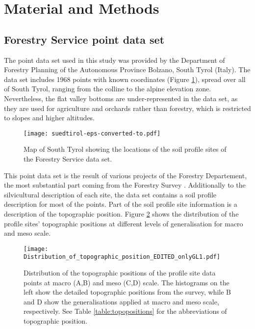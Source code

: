 \documentclass[preprint,12pt,authoryear]{elsarticle}
\begin{document}
\section{Material and Methods}
\subsection{Forestry Service point data set}
The point data set used in this study was provided by the Department of Forestry Planning of the Autonomous Province Bolzano, South Tyrol (Italy).
The data set includes 1968 points with known coordinates (Figure \ref{fig:datapoints}), spread over all of South Tyrol, ranging from the colline to the alpine elevation zone. Nevertheless, the flat valley bottoms are under-represented in the data set, as they are used for agriculture and orchards rather than forestry, which is restricted to slopes and higher altitudes.
\begin{figure}
\texttt{[image: suedtirol-eps-converted-to.pdf]}
\caption{Map of South Tyrol showing the locations of the soil profile sites of the Forestry Service data set.}
\label{fig:datapoints}
\end{figure}
 This point data set is the result of  various projects of the Forestry Departement, the most substantial part coming from the Forestry Survey \citep{APB2006}. Additionally to the silvicultural description of each site, the data set contains a soil profile description for most of the points. Part of the soil profile site information is a description of the topographic position. Figure \ref{fig:hist} shows the distribution of the profile sites' topographic positions at different levels of generalisation for macro and meso scale.

\begin{figure}
\texttt{[image: Distribution\_of\_topographic\_position\_EDITED\_onlyGL1.pdf]}
\caption{Distribution of the topographic positions of the profile site data points at macro (A,B) and meso (C,D) scale. The histograms on the left show the detailed topographic positions from the survey, while B and D show the generalisations applied at macro and meso scale, respectively. See Table \ref{table:topopositions} for the abbreviations of topographic position. }
\label{fig:hist}
\end{figure}
\end{document}
